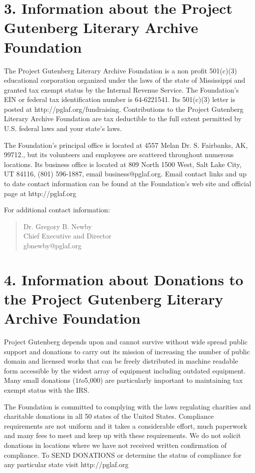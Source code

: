 \section*{3. Information about the Project Gutenberg Literary Archive
Foundation}

The Project Gutenberg Literary Archive Foundation is a non profit
501(c)(3) educational corporation organized under the laws of the
state of Mississippi and granted tax exempt status by the Internal
Revenue Service.  The Foundation's EIN or federal tax identification
number is 64-6221541.  Its 501(c)(3) letter is posted at
http://pglaf.org/fundraising.  Contributions to the Project Gutenberg
Literary Archive Foundation are tax deductible to the full extent
permitted by U.S. federal laws and your state's laws.

The Foundation's principal office is located at 4557 Melan Dr. S.
Fairbanks, AK, 99712., but its volunteers and employees are scattered
throughout numerous locations.  Its business office is located at
809 North 1500 West, Salt Lake City, UT 84116, (801) 596-1887, email
business@pglaf.org.  Email contact links and up to date contact
information can be found at the Foundation's web site and official
page at http://pglaf.org

For additional contact information:
\begin{quote}
     Dr. Gregory B. Newby\\
     Chief Executive and Director\\
     gbnewby@pglaf.org  \\
\end{quote}

\section*{4. Information about Donations to the Project Gutenberg
Literary Archive Foundation}

Project Gutenberg\texttrademark{} depends upon and cannot survive without wide
spread public support and donations to carry out its mission of
increasing the number of public domain and licensed works that can be
freely distributed in machine readable form accessible by the widest
array of equipment including outdated equipment.  Many small donations
($1 to $5,000) are particularly important to maintaining tax exempt
status with the IRS.

The Foundation is committed to complying with the laws regulating
charities and charitable donations in all 50 states of the United
States.  Compliance requirements are not uniform and it takes a
considerable effort, much paperwork and many fees to meet and keep up
with these requirements.  We do not solicit donations in locations
where we have not received written confirmation of compliance.  To
SEND DONATIONS or determine the status of compliance for any
particular state visit http://pglaf.org

